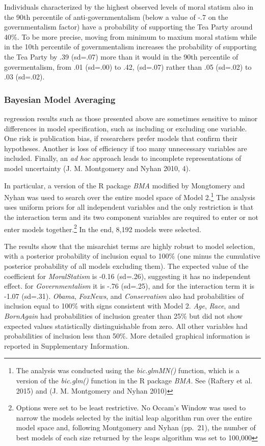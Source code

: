 \documentclass[12pt,]{article}
\begin{document}
Individuals characterized by the highest observed levels of moral
statism also in the 90th percentile of anti-governmentalism (below a
value of -.7 on the governmentalism factor) have a probability of
supporting the Tea Party around 40\%. To be more precise, moving from
minimum to maxium moral statism while in the 10th percentile of
governmentalism increases the probability of supporting the Tea Party by
.39 (sd=.07) more than it would in the 90th percentile of
govermentalism, from .01 (sd=.00) to .42, (sd=.07) rather than .05
(sd=.02) to .03 (sd=.02).

\clearpage

\subsubsection{Bayesian Model Averaging}\label{bayesian-model-averaging}

regression results such as those presented above are sometimes sensitive
to minor differences in model specification, such as including or
excluding one variable. One risk is publication bias, if researchers
prefer models that confirm their hypotheses. Another is loss of
efficiency if too many unnecessary variables are included. Finally, an
\emph{ad hoc} approach leads to incomplete representations of model
uncertainty (J. M. Montgomery and Nyhan 2010, 4).

In particular, a version of the R package \emph{BMA} modified by
Mongtomery and Nyhan was used to search over the entire model space of
Model 2.\footnote{The analysis was conducted using the
  \emph{bic.glmMN()} function, which is a version of the
  \emph{bic.glm()} function in the R package \emph{BMA}. See (Raftery et
  al. 2015) and (J. M. Montgomery and Nyhan 2010)} The analysis uses
uniform priors for all independent variables and the only restriction is
that the interaction term and its two component variables are required
to enter or not enter models together.\footnote{Options were set to be
  least restrictive. No Occam's Window was used to narrow the models
  selected by the initial leap algorithm run over the entire model space
  and, following Montgomery and Nyhan (pp.~21), the number of best
  models of each size returned by the leaps algorithm was set to 100,000}
In the end, 8,192 models were selected.

The results show that the misarchist terms are highly robust to model
selection, with a posterior probability of inclusion equal to 100\% (one
minus the cumulative posterior probability of all models excluding
them). The expected value of the coefficient for \emph{MoralStatism} is
-0.16 (sd=.26), suggesting it has no independent effect. for
\emph{Governmentalism} it is -.76 (sd=.25), and for the interaction term
it is -1.07 (sd=.31). \emph{Obama}, \emph{FoxNews}, and
\emph{Conservatism} also had probabilities of inclusion equal to 100\%
with signs consistent with Model 2. \emph{Age}, \emph{Race}, and
\emph{BornAgain} had probabilities of inclusion greater than 25\% but
did not show expected values statistically distinguishable from zero.
All other variables had probabilities of inclusion less than 50\%. More
detailed graphical information is reported in Supplementary Information.
\end{document}
